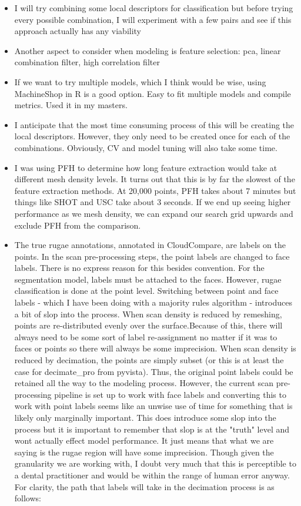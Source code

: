 \documentclass[11pt]{article}
\theoremstyle{definition}
\begin{document}
\begin{itemize}
    \item I will try combining some local descriptors for classification but before trying every possible combination, I will experiment with a few pairs and see if this approach actually has any viability
    \item Another aspect to consider when modeling is feature selection: pca, linear combination filter, high correlation filter
    \item If we want to try multiple models, which I think would be wise, using MachineShop in R is a good option. Easy to fit multiple models and compile metrics. Used it in my masters.
    \item I anticipate that the most time consuming process of this will be creating the local descriptors. However, they only need to be created once for each of the combinations. Obviously, CV and model tuning will also take some time. 
    \item I was using PFH to determine how long feature extraction would take at different mesh density levels. It turns out that this is by far the slowest of the feature extraction methods. At 20,000 points, PFH takes about 7 minutes but things like SHOT and USC take about 3 seconds. If we end up seeing higher performance as we mesh density, we can expand our search grid upwards and exclude PFH from the comparison.
    \item The true rugae annotations, annotated in CloudCompare, are labels on the points. In the scan pre-processing steps, the point labels are changed to face labels. There is no express reason for this besides convention. For the segmentation model, labels must be attached to the faces. However, rugae classification is done at the point level. Switching between point and face labels - which I have been doing with a majority rules algorithm - introduces a bit of slop into the process. When scan density is reduced by remeshing, points are re-distributed evenly over the surface.Because of this, there will always need to be some sort of label re-assignment no matter if it was to faces or points so there will always be some imprecision. When scan density is reduced by decimation, the points are simply subset (or this is at least the case for decimate\_pro from pyvista). Thus, the original point labels could be retained all the way to the modeling process. However, the current scan pre-processing pipeline is set up to work with face labels and converting this to work with point labels seems like an unwise use of time for something that is likely only marginally important. This does introduce some slop into the process but it is important to remember that slop is at the "truth" level and wont actually effect model performance. It just means that what we are saying is the rugae region will have some imprecision. Though given the granularity we are working with, I doubt very much that this is perceptible to a dental practitioner and would be within the range of human error anyway. For clarity, the path that labels will take in the decimation process is as follows:

\end{itemize}
\end{document}
